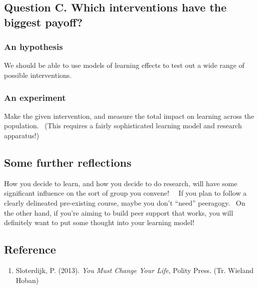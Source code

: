 \subsection{Question C. Which interventions have the biggest payoff?}

\subsubsection{\textbf{An hypothesis}}

We should be able to use models of learning effects to test out a wide
range of possible interventions.

\subsubsection{An experiment}

Make the given intervention, and measure the total impact on learning
across the population. ~(This requires a fairly sophisticated learning
model and research apparatus!)

\subsection{Some further reflections}

How you decide to learn, and how you decide to do research, will have
some significant influence on the sort of group you convene!~~ If you
plan to follow a clearly delineated pre-existing course, maybe you don't
``need'' peeragogy.~ On the other hand, if you're aiming to build peer
support that works, you will definitely want to put some thought into
your learning model!

\subsection{Reference}

\begin{enumerate}
\item
  Sloterdijk, P. (2013). \emph{You Must Change Your Life}, Polity Press.
  (Tr. Wieland Hoban)
\end{enumerate}
